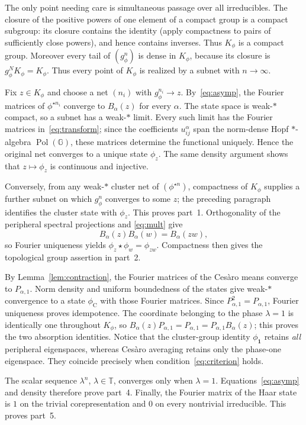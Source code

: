 \documentclass[11pt]{article}
\theoremstyle{remark}
\newcommand{\T}{\mathbb T}
\newcommand{\Pol}{\operatorname{Pol}}
\begin{document}
The only point needing care is simultaneous passage over all irreducibles.
The closure of the positive powers of one element of a compact group is a
compact subgroup: its closure contains the identity (apply compactness to
pairs of sufficiently close powers), and hence contains inverses.  Thus
$K_\phi$ is a compact group.  Moreover every tail of $(g_\phi^n)$ is dense in
$K_\phi$, because its closure is $g_\phi^N K_\phi=K_\phi$.  Thus every point
of $K_\phi$ is realized by a subnet with $n\to\infty$.

Fix $z\in K_\phi$ and choose a net $(n_i)$ with $g_\phi^{n_i}\to z$.
By~\eqref{eq:asymp}, the Fourier matrices of $\phi^{\star n_i}$ converge to
$B_\alpha(z)$ for every $\alpha$.  The state space is weak-$*$ compact, so a
subnet has a weak-$*$ limit.  Every such limit has the Fourier matrices
in~\eqref{eq:transform}; since the coefficients $u^\alpha_{ij}$ span the
norm-dense Hopf $*$-algebra $\Pol(\mathbb G)$, these matrices determine the
functional uniquely.  Hence the original net converges to a unique state
$\phi_z$.  The same density argument shows that $z\mapsto\phi_z$ is continuous
and injective.

Conversely, from any weak-$*$ cluster net of $(\phi^{\star n})$, compactness of
$K_\phi$ supplies a further subnet on which $g_\phi^n$ converges to some $z$;
the preceding paragraph identifies the cluster state with $\phi_z$.  This
proves part~1.  Orthogonality of the peripheral spectral projections and
\eqref{eq:mult} give
\[
 B_\alpha(z)B_\alpha(w)=B_\alpha(zw),
\]
so Fourier uniqueness yields $\phi_z\star\phi_w=\phi_{zw}$.  Compactness then
gives the topological group assertion in part~2.

By Lemma~\ref{lem:contraction}, the Fourier matrices of the Ces\`aro means
converge to $P_{\alpha,1}$.  Norm density and uniform boundedness of the states
give weak-$*$ convergence to a state $\phi_{\mathrm C}$ with those Fourier
matrices.  Since $P_{\alpha,1}^2=P_{\alpha,1}$, Fourier uniqueness proves
idempotence.  The coordinate belonging to the phase $\lambda=1$ is identically
one throughout $K_\phi$, so
$B_\alpha(z)P_{\alpha,1}=P_{\alpha,1}=P_{\alpha,1}B_\alpha(z)$; this proves the
two absorption identities.  Notice that the cluster-group identity
$\phi_{\mathbf1}$ retains \emph{all} peripheral eigenspaces, whereas Ces\`aro
averaging retains only the phase-one eigenspace.  They coincide precisely when
condition~\eqref{eq:criterion} holds.

The scalar sequence $\lambda^n$, $\lambda\in\T$, converges only when
$\lambda=1$.  Equations~\eqref{eq:asymp} and density therefore prove
part~4.  Finally, the Fourier matrix of the Haar state is $1$ on the trivial
corepresentation and $0$ on every nontrivial irreducible.  This proves
part~5.
\end{document}
